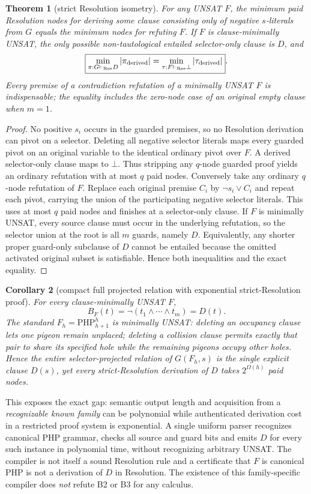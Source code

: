 \documentclass[11pt]{article}
\newtheorem{theorem}{Theorem}
\newtheorem{corollary}[theorem]{Corollary}
\begin{document}
\begin{theorem}[strict Resolution isometry]
For any UNSAT $F$, the minimum paid Resolution nodes for deriving \emph{some} clause consisting only of negative $s$-literals from $G$ equals the minimum nodes for refuting $F$. If $F$ is clause-minimally UNSAT, the only possible non-tautological entailed selector-only clause is $D$, and
\[
\boxed{\min_{\pi:G\vdash_{\rm Res}D}|\pi_{\rm derived}|
=\min_{\tau:F\vdash_{\rm Res}\bot}|\tau_{\rm derived}|}.
\]
Every premise of a contradiction refutation of a minimally UNSAT $F$ is indispensable; the equality includes the zero-node case of an original empty clause when $m=1$.
\end{theorem}
\begin{proof}
No positive $s_i$ occurs in the guarded premises, so no Resolution derivation can pivot on a selector. Deleting all negative selector literals maps every guarded pivot on an original variable to the identical ordinary pivot over $F$. A derived selector-only clause maps to $\bot$. Thus stripping any $q$-node guarded proof yields an ordinary refutation with at most $q$ paid nodes. Conversely take any ordinary $q$-node refutation of $F$. Replace each original premise $C_i$ by $\neg s_i\vee C_i$ and repeat each pivot, carrying the union of the participating negative selector literals. This uses at most $q$ paid nodes and finishes at a selector-only clause. If $F$ is minimally UNSAT, every source clause must occur in the underlying refutation, so the selector union at the root is all $m$ guards, namely $D$. Equivalently, any shorter proper guard-only subclause of $D$ cannot be entailed because the omitted activated original subset is satisfiable. Hence both inequalities and the exact equality.
\end{proof}

\begin{corollary}[compact full projected relation with exponential strict-Resolution proof]
For every clause-minimally UNSAT $F$,
\[
B_F(t)=\neg(t_1\wedge\cdots\wedge t_m)=D(t).
\]
The standard $F_h=\mathrm{PHP}_{h+1}^h$ is minimally UNSAT: deleting an occupancy clause lets one pigeon remain unplaced; deleting a collision clause permits exactly that pair to share its specified hole while the remaining pigeons occupy other holes. Hence the entire selector-projected relation of $G(F_h,s)$ is the \emph{single explicit clause} $D(s)$, yet every strict-Resolution derivation of $D$ takes $2^{\Omega(h)}$ paid nodes.
\end{corollary}
This exposes the exact gap: semantic output length and acquisition from a \emph{recognizable known family} can be polynomial while authenticated derivation cost in a restricted proof system is exponential. A single uniform parser recognizes canonical PHP grammar, checks all source and guard bits and emits $D$ for every such instance in polynomial time, without recognizing arbitrary UNSAT. The compiler is not itself a sound Resolution rule and a certificate that $F$ is canonical PHP is not a derivation of $D$ in Resolution. The existence of this family-specific compiler does \emph{not} refute B2 or B3 for any calculus.
\end{document}
